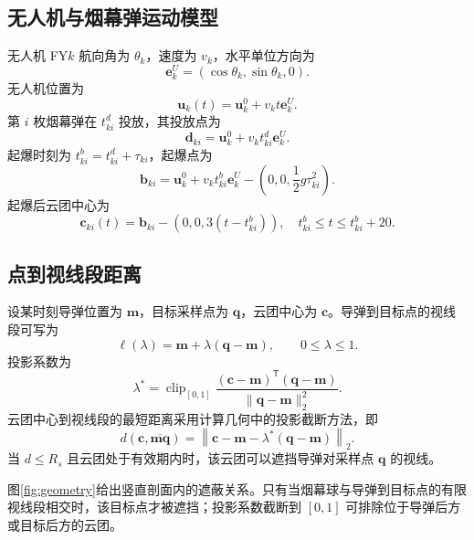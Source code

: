 \documentclass[12pt,a4paper]{ctexart}
\begin{document}
\subsection{无人机与烟幕弹运动模型}

无人机 FY$k$ 航向角为 $\theta_k$，速度为 $v_k$，水平单位方向为
\begin{equation}
\bm e_k^U=(\cos\theta_k,\sin\theta_k,0).
\end{equation}
无人机位置为
\begin{equation}
\bm u_k(t)=\bm u_k^0+v_kt\bm e_k^U.
\end{equation}
第 $i$ 枚烟幕弹在 $t_{ki}^{d}$ 投放，其投放点为
\begin{equation}
\bm d_{ki}=\bm u_k^0+v_kt_{ki}^{d}\bm e_k^U.
\end{equation}
起爆时刻为 $t_{ki}^{b}=t_{ki}^{d}+\tau_{ki}$，起爆点为
\begin{equation}
\bm b_{ki}=\bm u_k^0+v_kt_{ki}^{b}\bm e_k^U
-\left(0,0,\frac{1}{2}g\tau_{ki}^2\right).
\end{equation}
起爆后云团中心为
\begin{equation}
\bm c_{ki}(t)=\bm b_{ki}-(0,0,3(t-t_{ki}^{b})),\quad
t_{ki}^{b}\le t\le t_{ki}^{b}+20.
\end{equation}

\subsection{点到视线段距离}

设某时刻导弹位置为 $\bm m$，目标采样点为 $\bm q$，云团中心为 $\bm c$。导弹到目标点的视线段可写为
\begin{equation}
\bm \ell(\lambda)=\bm m+\lambda(\bm q-\bm m),\qquad 0\le\lambda\le1.
\end{equation}
投影系数为
\begin{equation}
\lambda^*=\operatorname{clip}_{[0,1]}
\frac{(\bm c-\bm m)^{\mathsf T}(\bm q-\bm m)}
{\|\bm q-\bm m\|_2^2}.
\end{equation}
云团中心到视线段的最短距离采用计算几何中的投影截断方法\cite{geom}，即
\begin{equation}
d(\bm c,\overline{\bm m\bm q})=
\left\|\bm c-\bm m-\lambda^*(\bm q-\bm m)\right\|_2.
\end{equation}
当 $d\le R_s$ 且云团处于有效期内时，该云团可以遮挡导弹对采样点 $\bm q$ 的视线。

图\ref{fig:geometry}给出竖直剖面内的遮蔽关系。只有当烟幕球与导弹到目标点的有限视线段相交时，该目标点才被遮挡；投影系数截断到 $[0,1]$ 可排除位于导弹后方或目标后方的云团。
\end{document}
